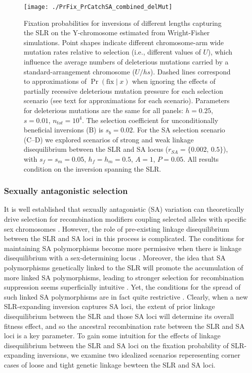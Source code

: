 \documentclass{article}[12pt]
\begin{document}
 \begin{figure}[htbp]
 \centering
 \texttt{[image: ./PrFix\_PrCatchSA\_combined\_delMut]}
 \caption[\captionsize]{Fixation probabilities for inversions of different lengths capturing the SLR on the Y-chromosome estimated from Wright-Fisher simulations. Point shapes indicate different chromosome-arm wide mutation rates relative to selection (i.e., different values of $U$), which influence the average numbers of deleterious mutations carried by a standard-arrangement chromosome ($U/hs$). Dashed lines correspond to approximations of $\Pr(\text{fix} \mid x)$ when ignoring the effects of partially recessive deleterious mutation pressure for each selection scenario (see text for approximations for each scenario). Parameters for deleterious mutations are the same for all panels: $h = 0.25$, $s = 0.01$, $n_{tot} = 10^4$. The selection coefficient for unconditionally beneficial inversions (B) is $s_b = 0.02$. For the SA selection scenario (C--D) we explored scenarios of strong and weak linkage disequilibrium between the SLR and SA locus ($r_{SA} = \{0.002,\, 0.5\}$), with $s_f = s_m = 0.05$, $h_f = h_m = 0.5$, $A = 1$, $P = 0.05$. All results condition on the inversion spanning the SLR.}
 \label{fig:PrFixFig}
 \end{figure}


\subsubsection*{Sexually antagonistic selection}\label{sec:SexAntag}

It is well established that sexually antagonistic (SA) variation can theoretically drive selection for recombination modifiers coupling selected alleles with specific sex chromosomes \cite[e.g.][]{Fisher1931,Nei1969, Charlesworth1978a, Charlesworth1980, Bull1983,Lenormand2003, Otto2019}. However, the role of pre-existing linkage disequilibrium between the SLR and SA loci in this process is complicated. The conditions for maintaining SA polymorphisms become more permissive when there is linkage disequilibrium with a sex-determining locus \citep{JordanCharlesworth2012}. Moreover, the idea that SA polymorphisms genetically linked to the SLR will promote the accumulation of more linked SA polymorphisms, leading to stronger selection for recombination suppression seems superficially intuitive \citep{Rice1984, Rice1996, Charlesworth2017, Otto2019}. Yet, the conditions for the spread of such linked SA polymorphisms are in fact quite restrictive \citep{Otto2019}. Clearly, when a new SLR-expanding inversion captures SA loci, the extent of prior linkage disequilibrium between the SLR and those SA loci will determine its overall fitness effect, and so the ancestral recombination rate between the SLR and SA loci is a key parameter. To gain some intuition for the effects of linkage disequilibrium between the SLR and SA loci on the fixation probability of SLR-expanding inversions, we examine two idealized scenarios reperesenting corner cases of loose and tight genetic linkage bewteen the SLR and SA loci.
\end{document}
